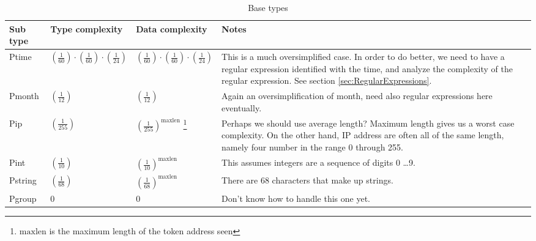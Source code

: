 \begin{longtable}{||l|l|l|l|}
\caption[Base types]{Base types}
\label{tab:v2Base}
\\\hline
\hline
Sub type & Type complexity & Data complexity & Notes \\\hline\hline

\textsf{Ptime} &
      $\left(\frac{1}{60}\right) \cdot \left(\frac{1}{60}\right) \cdot \left(\frac{1}{24}\right)$ &
      $\left(\frac{1}{60}\right) \cdot \left(\frac{1}{60}\right) \cdot \left(\frac{1}{24}\right)$ &
\parbox[t]{5cm}{
This is a much oversimplified case. In order to do better, we need to
have a regular expression identified with the time, and analyze the
complexity of the regular expression. See section
\ref{sec:RegularExpressions}.
\vspace{0.5mm}} \\\hline

\textsf{Pmonth} & $\left(\frac{1}{12}\right)$ & $\left(\frac{1}{12}\right)$ &
\parbox[t]{5cm}{
Again an oversimplification of month, need also regular expressions here
eventually.
\vspace{0.5mm}} \\\hline

\textsf{Pip} &
    $\left(\frac{1}{255}\right)$ &
    $\left(\frac{1}{255}\right)^\mathrm{maxlen}$
\footnote{$\mathrm{maxlen}$ is the maximum length of the token address seen} &
\parbox[t]{5cm}{
Perhaps we should use average length? Maximum length gives us a worst
case complexity. On the other hand, IP address are often all of the same
length, namely four number in the range 0 through 255.
\vspace{0.5mm}} \\\hline

\textsf{Pint} &
    $\left(\frac{1}{10}\right)$ &
    $\left(\frac{1}{10}\right)^\mathrm{maxlen}$ &
\parbox[t]{5cm}{
This assumes integers are a sequence of digits 0 \ldots 9.
\vspace{0.5mm}} \\\hline

\textsf{Pstring} &
    $\left(\frac{1}{68}\right)$ &
    $\left(\frac{1}{68}\right)^\mathrm{maxlen}$ &
\parbox[t]{5cm}{
There are 68 characters that make up strings.
\vspace{0.5mm}} \\\hline

\textsf{Pgroup} & 0 & 0 &
\parbox[t]{5cm}{
Don't know how to handle this one yet.
\vspace{0.5mm}} \\\hline


\end{longtable}
